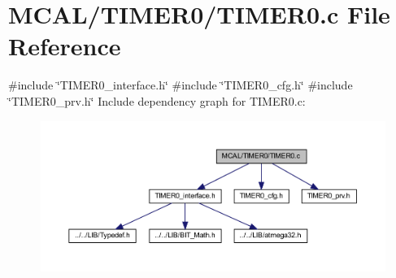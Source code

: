 \section{M\+C\+A\+L/\+T\+I\+M\+E\+R0/\+T\+I\+M\+E\+R0.c File Reference}
\label{_t_i_m_e_r0_8c}
{\ttfamily \#include \char`\"{}T\+I\+M\+E\+R0\+\_\+interface.\+h\char`\"{}}\newline
{\ttfamily \#include \char`\"{}T\+I\+M\+E\+R0\+\_\+cfg.\+h\char`\"{}}\newline
{\ttfamily \#include \char`\"{}T\+I\+M\+E\+R0\+\_\+prv.\+h\char`\"{}}\newline
Include dependency graph for T\+I\+M\+E\+R0.\+c\+:\nopagebreak
\begin{figure}[H]
\begin{center}
\leavevmode
\includegraphics[width=350pt]{_t_i_m_e_r0_8c__incl}
\end{center}
\end{figure}
